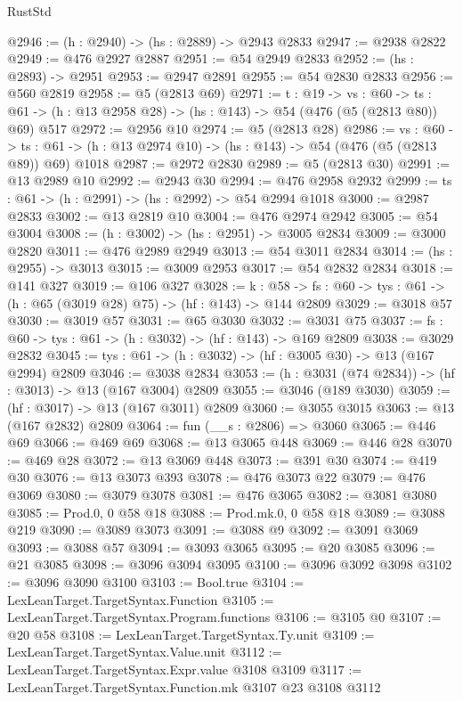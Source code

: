 \begin{lexlean}{RustStd}
\begin{coremodule}
{\begin{coremodule}
{{{{{{{@2946 := (h : @2940) -> (hs : @2889) -> @2943 @2833
@2947 := @2938 @2822
@2949 := @476 @2927 @2887
@2951 := @54 @2949 @2833
@2952 := (hs : @2893) -> @2951
@2953 := @2947 @2891
@2955 := @54 @2830 @2833
@2956 := @560 @2819
@2958 := @5 (@2813 @69)
@2971 := {t : @19} ->
  {vs : @60} ->
  {ts : @61} -> (h : @13 @2958 @28) -> (hs : @143) -> @54 (@476 (@5 (@2813 @80)) @69) @517
@2972 := @2956 @10
@2974 := @5 (@2813 @28)
@2986 := {vs : @60} ->
  {ts : @61} -> (h : @13 @2974 @10) -> (hs : @143) -> @54 (@476 (@5 (@2813 @89)) @69) @1018
@2987 := @2972 @2830
@2989 := @5 (@2813 @30)
@2991 := @13 @2989 @10
@2992 := @2943 @30
@2994 := @476 @2958 @2932
@2999 := {ts : @61} -> (h : @2991) -> (hs : @2992) -> @54 @2994 @1018
@3000 := @2987 @2833
@3002 := @13 @2819 @10
@3004 := @476 @2974 @2942
@3005 := @54 @3004
@3008 := (h : @3002) -> (hs : @2951) -> @3005 @2834
@3009 := @3000 @2820
@3011 := @476 @2989 @2949
@3013 := @54 @3011 @2834
@3014 := (hs : @2955) -> @3013
@3015 := @3009 @2953
@3017 := @54 @2832 @2834
@3018 := @141 @327
@3019 := @106 @327
@3028 := {k : @58} ->
  {fs : @60} -> {tys : @61} -> (h : @65 (@3019 @28) @75) -> (hf : @143) -> @144 @2809
@3029 := @3018 @57
@3030 := @3019 @57
@3031 := @65 @3030
@3032 := @3031 @75
@3037 := {fs : @60} -> {tys : @61} -> (h : @3032) -> (hf : @143) -> @169 @2809
@3038 := @3029 @2832
@3045 := {tys : @61} -> (h : @3032) -> (hf : @3005 @30) -> @13 (@167 @2994) @2809
@3046 := @3038 @2834
@3053 := (h : @3031 (@74 @2834)) -> (hf : @3013) -> @13 (@167 @3004) @2809
@3055 := @3046 (@189 @3030)
@3059 := (hf : @3017) -> @13 (@167 @3011) @2809
@3060 := @3055 @3015
@3063 := @13 (@167 @2832) @2809
@3064 := fun (__s : @2806) => @3060
@3065 := @446 @69
@3066 := @469 @69
@3068 := @13 @3065 @448
@3069 := @446 @28
@3070 := @469 @28
@3072 := @13 @3069 @448
@3073 := @391 @30
@3074 := @419 @30
@3076 := @13 @3073 @393
@3078 := @476 @3073 @22
@3079 := @476 @3069
@3080 := @3079 @3078
@3081 := @476 @3065
@3082 := @3081 @3080
@3085 := Prod.{0, 0} @58 @18
@3088 := Prod.mk.{0, 0} @58 @18
@3089 := @3088 @219
@3090 := @3089 @3073
@3091 := @3088 @9
@3092 := @3091 @3069
@3093 := @3088 @57
@3094 := @3093 @3065
@3095 := @20 @3085
@3096 := @21 @3085
@3098 := @3096 @3094 @3095
@3100 := @3096 @3092 @3098
@3102 := @3096 @3090 @3100
@3103 := Bool.true
@3104 := LexLeanTarget.TargetSyntax.Function
@3105 := LexLeanTarget.TargetSyntax.Program.functions
@3106 := @3105 @0
@3107 := @20 @58
@3108 := LexLeanTarget.TargetSyntax.Ty.unit
@3109 := LexLeanTarget.TargetSyntax.Value.unit
@3112 := LexLeanTarget.TargetSyntax.Expr.value @3108 @3109
@3117 := LexLeanTarget.TargetSyntax.Function.mk @3107 @23 @3108 @3112
}}}}}}}
\end{coremodule}}
\end{coremodule}
\end{lexlean}
